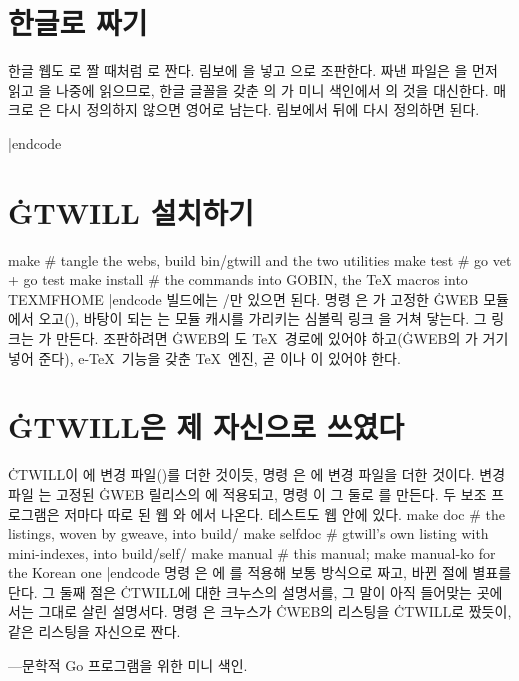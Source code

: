 \chapter{한글로 짜기}
\noindent 한글 웹도 로 짤 때처럼 로 짠다. 림보에
을 넣고 으로 조판한다. 짜낸 파일은
을 먼저 읽고 을 나중에 읽으므로, 한글 글꼴을 갖춘
의 가 미니 색인에서 의 것을 대신한다.
매크로 은 다시 정의하지 않으면 영어로 남는다. 림보에서
 뒤에 다시 정의하면 된다.
\begincode

\def\twilllabel{레이블}
|endcode

\chapter{\.{GTWILL} 설치하기}
\begincode
make            # tangle the webs, build bin/gtwill and the two utilities
make test       # go vet + go test
make install    # the commands into GOBIN, the TeX macros into TEXMFHOME
|endcode
빌드에는 \GO/만 있으면 된다. 명령 은 가 고정한 \.{GWEB}
모듈에서 오고(), 바탕이 되는 는 모듈 캐시를
가리키는 심볼릭 링크 을 거쳐 닿는다. 그 링크는 가 만든다.
조판하려면 \.{GWEB}의 도 \TeX\ 경로에 있어야 하고(\.{GWEB}의
가 거기 넣어 준다), e-\TeX\ 기능을 갖춘 \TeX\ 엔진, 곧 이나
이 있어야 한다.

\chapter{\.{GTWILL}은 제 자신으로 쓰였다}
\noindent \.{CTWILL}이 에 변경 파일()를 더한 것이듯,
명령 은 에 변경 파일을 더한 것이다. 변경 파일
는 고정된 \.{GWEB} 릴리스의 에 적용되고,
명령 이 그 둘로 를 만든다. 두 보조 프로그램은 저마다
따로 된 웹 와 에서 나온다. 테스트도 웹 안에 있다.
\begincode
make doc        # the listings, woven by gweave, into build/
make selfdoc    # gtwill's own listing with mini-indexes, into build/self/
make manual     # this manual; make manual-ko for the Korean one
|endcode
명령 은 에 를 적용해 보통 방식으로 짜고,
바뀐 절에 별표를 단다. 그 둘째 절은 \.{CTWILL}에 대한 크누스의 설명서를, 그 말이
아직 들어맞는 곳에서는 그대로 살린 설명서다. 명령 은 크누스가
\.{CWEB}의 리스팅을 \.{CTWILL}로 짰듯이, 같은 리스팅을  자신으로 짠다.

\vfill
\centerline{\eightrm{}---문학적 Go 프로그램을 위한 미니 색인.}
\bye

